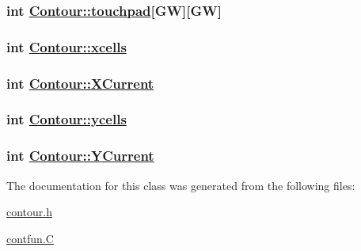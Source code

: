 \hypertarget{classContour_o9}{
\subsubsection[touchpad]{\setlength{\rightskip}{0pt plus 5cm}int \hyperlink{classContour_o9}{Contour::touchpad}\mbox{[}GW\mbox{]}\mbox{[}GW\mbox{]}}}
\label{classContour_o9}


\hypertarget{classContour_o1}{
\subsubsection[xcells]{\setlength{\rightskip}{0pt plus 5cm}int \hyperlink{classContour_o1}{Contour::xcells}}}
\label{classContour_o1}


\hypertarget{classContour_o16}{
\subsubsection[XCurrent]{\setlength{\rightskip}{0pt plus 5cm}int \hyperlink{classContour_o16}{Contour::XCurrent}}}
\label{classContour_o16}


\hypertarget{classContour_o2}{
\subsubsection[ycells]{\setlength{\rightskip}{0pt plus 5cm}int \hyperlink{classContour_o2}{Contour::ycells}}}
\label{classContour_o2}


\hypertarget{classContour_o17}{
\subsubsection[YCurrent]{\setlength{\rightskip}{0pt plus 5cm}int \hyperlink{classContour_o17}{Contour::YCurrent}}}
\label{classContour_o17}




The documentation for this class was generated from the following files:\begin{CompactItemize}
\item 
\hyperlink{contour_8h}{contour.h}\item 
\hyperlink{contfun_8C}{contfun.C}\end{CompactItemize}
